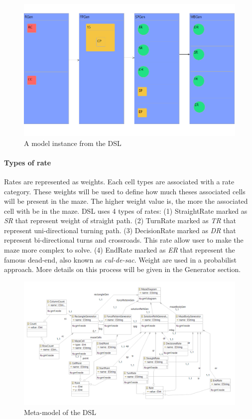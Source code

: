 \documentclass[review]{elsarticle}
\begin{document}
\begin{figure}
	\includegraphics[width=\linewidth]{model.png}
	\caption{A model instance from the DSL}
	\label{fig:model}
\end{figure}

\paragraph{Types of rate}
Rates are represented as weights. Each cell types are associated with a rate category. These weights will be used to define how much theses associated cells will be present in the maze. The higher weight value is, the more the associated cell with be in the maze. DSL uses 4 types of rates: (1) StraightRate marked as \textit{SR} that represent weight of straight path. (2) TurnRate marked as \textit{TR} that represent uni-directional turning path. (3) DecisionRate marked as \textit{DR} that represent bi-directional turns and crossroads. This rate allow user to make the maze more complex to solve. (4) EndRate marked as \textit{ER} that represent the famous dead-end, also known as  \textit{cul-de-sac}. Weight are used in a probabilist approach. More details on this process will be given in the Generator section.

\begin{figure}
	\includegraphics[width=\linewidth]{metamodel.png}
	\caption{Meta-model of the DSL}
	\label{fig:metamodel}
\end{figure}
\end{document}
